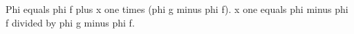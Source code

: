 Phi equals phi f plus x one times (phi g minus phi f).  
x one equals phi minus phi f divided by phi g minus phi f.